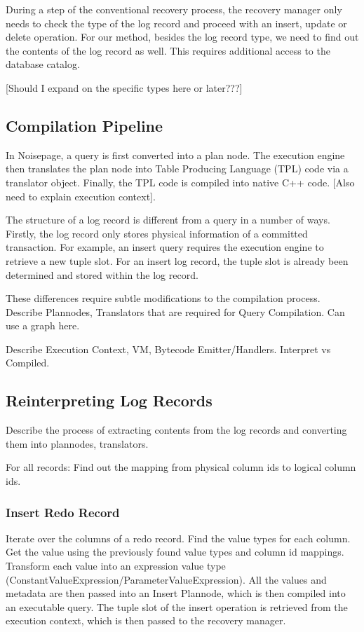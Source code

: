 \documentclass[12pt]{cmuthesis}
\begin{document}
During a step of the conventional recovery process, the recovery manager only needs to check the type of the log record and proceed with an insert, update or delete operation. For our method, besides the log record type, we need to find out the contents of the log record as well. This requires additional access to the database catalog.

[Should I expand on the specific types here or later???]
\subsection{Compilation Pipeline}
In Noisepage, a query is first converted into a plan node. The execution engine then translates the plan node into Table Producing Language (TPL) code via a translator object. Finally, the TPL code is compiled into native C++ code. [Also need to explain execution context].

The structure of a log record is different from a query in a number of ways. Firstly, the log record only stores physical information of a committed transaction. For example, an insert query requires the execution engine to retrieve a new tuple slot. For an insert log record, the tuple slot is already been determined and stored within the log record.

These differences require subtle modifications to the compilation process.
Describe Plannodes, Translators that are required for Query Compilation. Can use a graph here.

Describe Execution Context, VM, Bytecode Emitter/Handlers. Interpret vs Compiled.

\subsection{Reinterpreting Log Records}
Describe the process of extracting contents from the log records and converting them into plannodes, translators.

For all records: Find out the mapping from physical column ids to logical column ids.

\subsubsection{Insert Redo Record}
Iterate over the columns of a redo record. Find the value types for each column. Get the value using the previously found value types and column id mappings. Transform each value into an expression value type (ConstantValueExpression/ParameterValueExpression). All the values and metadata are then passed into an Insert Plannode, which is then compiled into an executable query. The tuple slot of the insert operation is retrieved from the execution context, which is then passed to the recovery manager.
\end{document}
